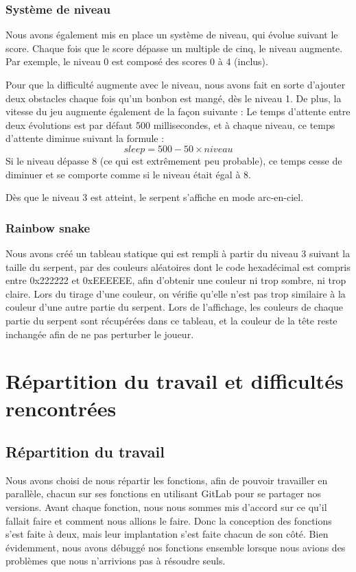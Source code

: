 \documentclass[a4paper]{article}
\begin{document}
\subsubsection*{Système de niveau}
Nous avons également mis en place un système de niveau, qui évolue suivant le score. Chaque fois que le score dépasse un multiple de cinq, le niveau augmente. Par exemple, 
le niveau 0 est composé des scores 0 à 4 (inclus).

Pour que la difficulté augmente avec le niveau, nous avons fait en sorte d'ajouter deux obstacles chaque fois qu'un bonbon est mangé, dès le niveau 1. De plus, la vitesse 
du jeu augmente également de la façon suivante : Le temps d'attente entre deux évolutions est par défaut 500 millisecondes, et à chaque niveau, ce temps d'attente diminue 
suivant la formule :
\[sleep = 500-50\times niveau\]
Si le niveau dépasse 8 (ce qui est extrêmement peu probable), ce temps cesse de diminuer et se comporte comme si le niveau était égal à 8.

Dès que le niveau 3 est atteint, le serpent s'affiche en mode arc-en-ciel.

\subsubsection*{Rainbow snake}
Nous avons créé un tableau statique qui est rempli à partir du niveau 3 suivant la taille du serpent, par des couleurs aléatoires dont le code hexadécimal est compris entre 
0x222222 et 0xEEEEEE, afin d'obtenir une couleur ni trop sombre, ni trop claire. Lors du tirage d'une couleur, on vérifie qu'elle n'est pas trop similaire à la couleur d'une 
autre partie du serpent.
Lors de l'affichage, les couleurs de chaque partie du serpent sont récupérées dans ce tableau, et la couleur de la tête reste inchangée afin de ne pas perturber le joueur.

\section{Répartition du travail et difficultés rencontrées}

\subsection{Répartition du travail}
Nous avons choisi de nous répartir les fonctions, afin de pouvoir travailler en parallèle, chacun sur ses fonctions en utilisant GitLab pour se partager nos versions.
Avant chaque fonction, nous nous sommes mis d'accord sur ce qu'il fallait faire et comment nous allions le faire. Donc la conception des fonctions s'est faite à deux, mais
leur implantation s'est faite chacun de son côté. Bien évidemment, nous avons débuggé nos fonctions ensemble lorsque nous avions des problèmes que nous n'arrivions pas 
à résoudre seuls.
\end{document}
